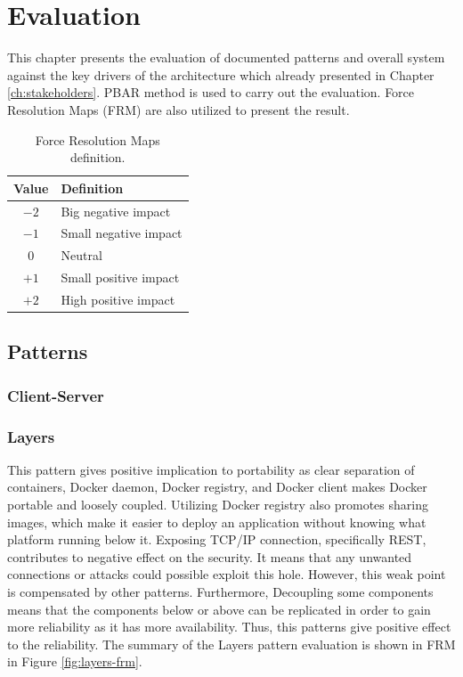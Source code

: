 
\clearpage
\chapter{Evaluation}
\label{ch:evaluation}
This chapter presents the evaluation of documented patterns and overall system
against the key drivers of the architecture which already presented in Chapter
\ref{ch:stakeholders}. PBAR\cite{pbar} method is used to carry out the
evaluation. Force Resolution Maps (FRM) are also utilized to present the result.

\begin{table}[H]
\centering
\caption{Force Resolution Maps definition.}
\label{tab:frm-table}
\begin{tabular}{cl}
\textbf{Value} & \textbf{Definition} \\ \toprule
            $-2$   & Big negative impact \\
            $-1$   & Small negative impact \\
            $0$    & Neutral \\
            $+1$   & Small positive impact \\
            $+2$   & High positive impact 
\end{tabular}
\end{table}

\section{Patterns}
\subsection{Client-Server}
\subsection{Layers}
This pattern gives positive implication to portability as clear separation of
containers, Docker daemon, Docker registry, and Docker client makes Docker
portable and loosely coupled. Utilizing Docker registry also promotes sharing
images, which make it easier to deploy an application without knowing what
platform running below it. Exposing TCP/IP connection, specifically REST,
contributes to negative effect on the security. It means that any unwanted
connections or attacks could possible exploit this hole. However, this weak
point is compensated by other patterns. Furthermore, Decoupling some components
means that the components below or above can be replicated in order to gain more
reliability as it has more availability. Thus, this patterns give positive
effect to the reliability. The summary of the Layers pattern evaluation is shown
in FRM in Figure \ref{fig:layers-frm}.

